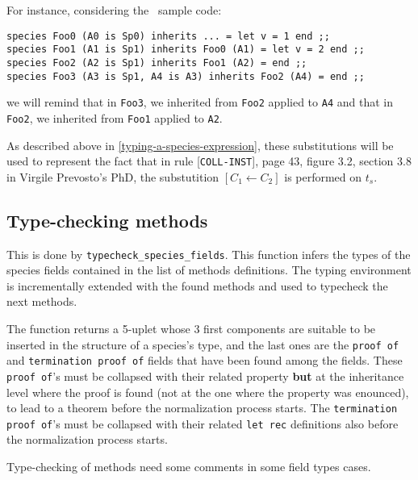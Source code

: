 For instance, considering the \focalize\ sample code:
{\footnotesize
\begin{lstlisting}
species Foo0 (A0 is Sp0) inherits ... = let v = 1 end ;;
species Foo1 (A1 is Sp1) inherits Foo0 (A1) = let v = 2 end ;;
species Foo2 (A2 is Sp1) inherits Foo1 (A2) = end ;;
species Foo3 (A3 is Sp1, A4 is A3) inherits Foo2 (A4) = end ;;
\end{lstlisting}
}

\noindent we will remind that in {\tt Foo3}, we inherited from
{\tt Foo2} applied to {\tt A4} and that in {\tt Foo2}, we inherited
from {\tt Foo1} applied to {\tt A2}.

As described above in \ref{typing-a-species-expression}, these
substitutions will be used to represent the fact that in rule
[{\tt COLL-INST}], page 43, figure 3.2, section 3.8 in Virgile
Prevosto's PhD, the substutition $[C_1 \leftarrow C_2]$ is performed
on $t_s$.



\subsection{Type-checking methods}
This is done by {\tt typecheck\_species\_fields}. This function infers
the types of the species fields contained in the list of methods
definitions. The typing environment is incrementally extended with the
found methods and used to typecheck the next methods.

The function returns a 5-uplet whose 3 first components are suitable to
be inserted in the structure of a species's type, and the last ones are
the {\tt proof of} and {\tt termination proof of} fields that have
been found among the fields. These {\tt proof of}'s must be collapsed
with their related property {\bf but} at the inheritance level where
the proof is found (not at the one where the property was enounced),
to lead to a theorem before the normalization process starts.
The {\tt termination proof of}'s must be collapsed with their related
{\tt let rec} definitions also before the normalization process
starts.

Type-checking of methods need some comments in some field types
cases.

